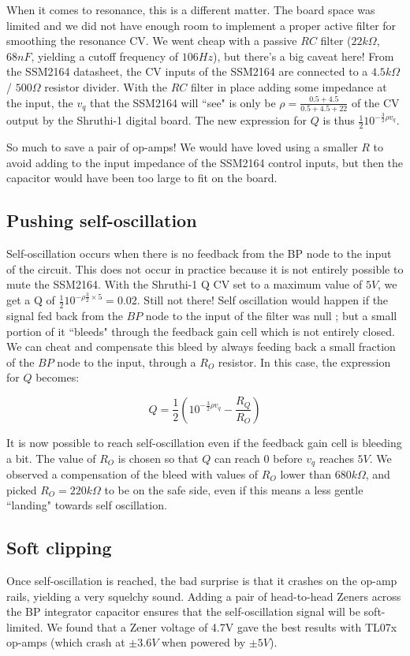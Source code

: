 \documentclass[a4paper,11pt]{article}
\begin{document}
When it comes to resonance, this is a different matter. The board space was limited and we did not have enough room to implement a proper active filter for smoothing the resonance CV. We went cheap with a passive $RC$ filter ($22k\Omega$, $68nF$, yielding a cutoff frequency of $106 Hz$), but there's a big caveat here! From the SSM2164 datasheet, the CV inputs of the SSM2164 are connected to a $4.5k\Omega$ / $500\Omega$ resistor divider. With the $RC$ filter in place adding some impedance at the input, the $v_{q}$ that the SSM2164 will ``see" is only be $\rho = \frac{0.5 + 4.5}{0.5 + 4.5 + 22}$ of the CV output by the Shruthi-1 digital board. The new expression for $Q$ is thus $\frac{1}{2} 10^{-\frac{3}{2} \rho v_{q}}$.

So much to save a pair of op-amps! We would have loved using a smaller $R$ to avoid adding to the input impedance of the SSM2164 control inputs, but then the capacitor would have been too large to fit on the board.

\subsection{Pushing self-oscillation}

Self-oscillation occurs when there is no feedback from the BP node to the input of the circuit. This does not occur in practice because it is not entirely possible to mute the SSM2164. With the Shruthi-1 Q CV set to a maximum value of $5V$, we get a Q of $\frac{1}{2} 10^{-\rho \frac{3}{2} \times 5} = 0.02$. Still not there! Self oscillation would happen if the signal fed back from the $BP$ node to the input of the filter was null ; but a small portion of it ``bleeds" through the feedback gain cell which is not entirely closed. We can cheat and compensate this bleed by always feeding back a small fraction of the $BP$ node to the input, through a $R_O$ resistor. In this case, the expression for $Q$ becomes:

$$Q = \frac{1}{2} \left(10^{-\frac{3}{2} \rho v_{q}} - \frac{R_Q}{R_O}\right)$$

It is now possible to reach self-oscillation even if the feedback gain cell is bleeding a bit. The value of $R_O$ is chosen so that $Q$ can reach 0 before $v_{q}$ reaches $5V$. We observed a compensation of the bleed with values of $R_O$ lower than $680k\Omega$, and picked $R_O = 220k\Omega$ to be on the safe side, even if this means a less gentle ``landing" towards self oscillation.

\subsection{Soft clipping}

Once self-oscillation is reached, the bad surprise is that it crashes on the op-amp rails, yielding a very squelchy sound. Adding a pair of head-to-head Zeners across the BP integrator capacitor ensures that the self-oscillation signal will be soft-limited. We found that a Zener voltage of 4.7V gave the best results with TL07x op-amps (which crash at $\pm 3.6V$ when powered by $\pm 5V$).
\end{document}
